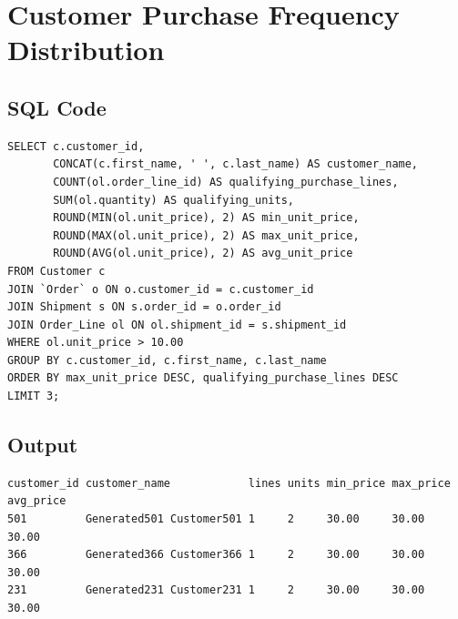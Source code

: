 \section{Customer Purchase Frequency Distribution}

\subsection{SQL Code}
{\scriptsize
\begin{verbatim}
SELECT c.customer_id,
       CONCAT(c.first_name, ' ', c.last_name) AS customer_name,
       COUNT(ol.order_line_id) AS qualifying_purchase_lines,
       SUM(ol.quantity) AS qualifying_units,
       ROUND(MIN(ol.unit_price), 2) AS min_unit_price,
       ROUND(MAX(ol.unit_price), 2) AS max_unit_price,
       ROUND(AVG(ol.unit_price), 2) AS avg_unit_price
FROM Customer c
JOIN `Order` o ON o.customer_id = c.customer_id
JOIN Shipment s ON s.order_id = o.order_id
JOIN Order_Line ol ON ol.shipment_id = s.shipment_id
WHERE ol.unit_price > 10.00
GROUP BY c.customer_id, c.first_name, c.last_name
ORDER BY max_unit_price DESC, qualifying_purchase_lines DESC
LIMIT 3;
\end{verbatim}
}

\subsection{Output}
{\scriptsize
\begin{verbatim}
customer_id customer_name            lines units min_price max_price avg_price
501         Generated501 Customer501 1     2     30.00     30.00     30.00
366         Generated366 Customer366 1     2     30.00     30.00     30.00
231         Generated231 Customer231 1     2     30.00     30.00     30.00
\end{verbatim}
}
